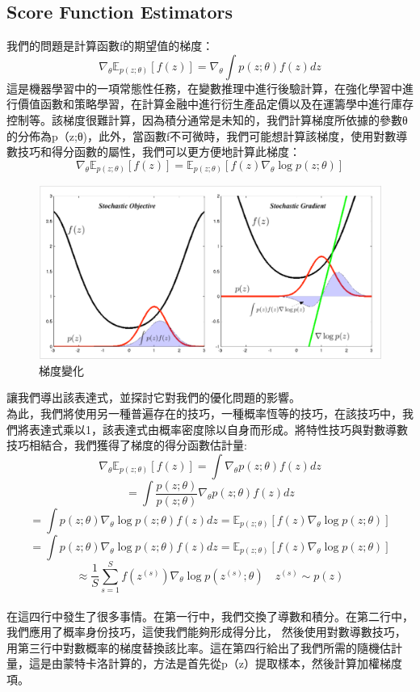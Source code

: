 \documentclass[14pt,a4paper]{report}  %
\begin{document}
\subsection{Score Function Estimators}
我們的問題是計算函數f的期望值的梯度：\\
$$\nabla_\theta \mathbb{E}_{p(z;\theta)}[f(z)] =\nabla_\theta \int p(z; \theta)f(z) dz$$
 這是機器學習中的一項常態性任務，在變數推理中進行後驗計算，在強化學習中進行價值函數和策略學習，在計算金融中進行衍生產品定價以及在運籌學中進行庫存控制等。該梯度很難計算，因為積分通常是未知的，我們計算梯度所依據的參數θ的分佈為p（z;θ)，此外，當函數f不可微時，我們可能想計算該梯度，使用對數導數技巧和得分函數的屬性，我們可以更方便地計算此梯度：\\
$$\nabla_\theta \mathbb{E}_{p(z;\theta)}[f(z)] = \mathbb{E}_{p(z;\theta)}[f(z)\nabla_\theta \log p(z;\theta)]$$
\begin{figure}[hbt!]
\begin{center}
\includegraphics[scale=0.5]{gradient_change}
\caption{梯度變化}
\end{center}
\end{figure}
 讓我們導出該表達式，並探討它對我們的優化問題的影響。\\
 為此，我們將使用另一種普遍存在的技巧，一種概率恆等的技巧，在該技巧中，我們將表達式乘以1，該表達式由概率密度除以自身而形成。將特性技巧與對數導數技巧相結合，我們獲得了梯度的得分函數估計量:\\
$$\nabla_\theta \mathbb{E}_{p(z;\theta)}[f(z)]=\int\nabla_\theta p(z;\theta)f(z) dz$$
$$= \int \frac{p(z;\theta)}{p(z;\theta)}\nabla_\theta p(z;\theta)f(z) dz$$
$$=\int p(z;\theta)\nabla_\theta \log p(z;\theta)f(z) dz = \mathbb{E}_{p(z;\theta)}[f(z)\nabla_\theta \log p(z;\theta)]$$
$$=\int p(z;\theta)\nabla_\theta \log p(z;\theta)f(z) dz = \mathbb{E}_{p(z;\theta)}[f(z)\nabla_\theta \log p(z;\theta)]$$
$$\approx \frac{1}{S} \sum_{s=1}^{S}f(z^{(s)})\nabla_\theta \log p(z^{(s)};\theta) \quad z^{(s)}\sim p(z)$$\\
在這四行中發生了很多事情。在第一行中，我們交換了導數和積分。在第二行中，我們應用了概率身份技巧，這使我們能夠形成得分比， 然後使用對數導數技巧，用第三行中對數概率的梯度替換該比率。這在第四行給出了我們所需的隨機估計量，這是由蒙特卡洛計算的，方法是首先從p（z）提取樣本，然後計算加權梯度項。\\
\end{document}

